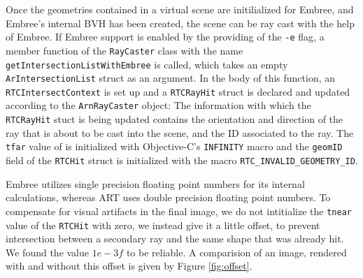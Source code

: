Once the geometries contained in a virtual scene are initilialized for Embree, and Embree's internal BVH has been created, the scene can be ray cast with the help of Embree. If Embree support is enabled by the providing of the \texttt{-e} flag, a member function of the \texttt{RayCaster} class with the name \texttt{getIntersectionListWithEmbree} is called, which takes an empty \texttt{ArIntersectionList} struct  as an argument. In the body of this function, an \texttt{RTCIntersectContext} is set up and a \texttt{RTCRayHit} struct is declared and updated according to the \texttt{ArnRayCaster} object: The information with which the  \texttt{RTCRayHit} stuct is being updated contains the orientation and direction of the ray that is about to be cast into the scene, and the ID associated to the ray. The \texttt{tfar} value of is initialized with Objective-C's \texttt{INFINITY} macro and the \texttt{geomID} field of the \texttt{RTCHit} struct is initialized with the macro \texttt{RTC\_INVALID\_GEOMETRY\_ID}. 

Embree utilizes single precision floating point numbers for its internal calculations, whereas ART uses double precision floating point numbers. To compensate for visual artifacts in the final image, we do not intitialize the \texttt{tnear} value of the \texttt{RTCHit} with zero, we instead give it a little offset, to prevent intersection between a secondary ray and the same shape that was already hit. We found the value $1e-3f$ to be reliable. A comparision of an image, rendered with and without this offset is given by Figure \ref{fig:offset}.

